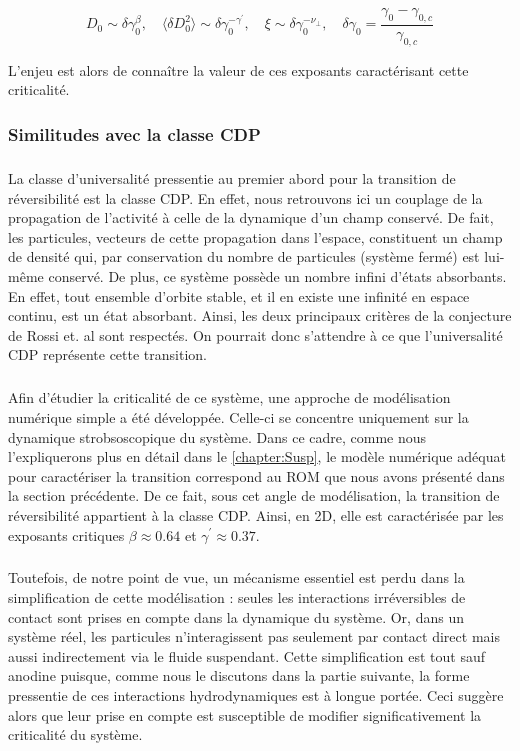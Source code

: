\begin{equation}
	D_0 \sim \delta\gamma_0^\beta, \quad \langle \delta D_0^2 \rangle \sim \delta\gamma_0^{-\gamma^\prime},\quad \xi \sim \delta\gamma_0^{-\nu_\perp}, \quad \delta\gamma_0 = \frac{\gamma_0-\gamma_{0,c}}{\gamma_{0,c}}
\end{equation}

\noindent L'enjeu est alors de connaître la valeur de ces exposants caractérisant cette criticalité.

\subsubsection{Similitudes avec la classe CDP}

\subparagraph{}La classe d'universalité pressentie au premier abord pour la transition de réversibilité est la classe CDP. En effet, nous retrouvons ici un couplage de la propagation de l'activité à celle de la dynamique d'un champ conservé. De fait, les particules, vecteurs de cette propagation dans l'espace, constituent un champ de densité qui, par conservation du nombre de particules (système fermé) est lui-même conservé. De plus, ce système possède un nombre infini d'états absorbants. En effet, tout ensemble d'orbite stable, et il en existe une infinité en espace continu, est un état absorbant. Ainsi, les deux principaux critères de la conjecture de Rossi et. al \cite{rossi_universality_2000} sont respectés. On pourrait donc s'attendre à ce que l'universalité CDP représente cette transition.

\subparagraph{}Afin d'étudier la criticalité de ce système, une approche de modélisation numérique simple a été développée. Celle-ci se concentre uniquement sur la dynamique strobsoscopique du système. Dans ce cadre, comme nous l'expliquerons plus en détail dans le \autoref{chapter:Susp}, le modèle numérique adéquat pour caractériser la transition correspond au ROM que nous avons présenté dans la section précédente. De ce fait, sous cet angle de modélisation, la transition de réversibilité appartient à la classe CDP. Ainsi, en 2D, elle est caractérisée par les exposants critiques $\beta \approx 0.64$ et $\gamma^\prime \approx 0.37$.

\subparagraph{}Toutefois, de notre point de vue, un mécanisme essentiel est perdu dans la simplification de cette modélisation : seules les interactions irréversibles de contact sont prises en compte dans la dynamique du système. Or, dans un système réel, les particules n'interagissent pas seulement par contact direct mais aussi indirectement via le fluide suspendant. Cette simplification est tout sauf anodine puisque, comme nous le discutons dans la partie suivante, la forme pressentie de ces interactions hydrodynamiques est à longue portée. Ceci suggère alors que leur prise en compte est susceptible de modifier significativement la criticalité du système.

